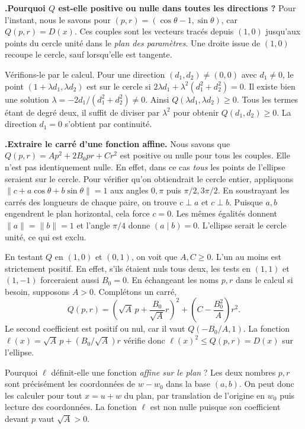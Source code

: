 \documentclass[a4paper,12pt]{article}
\newcommand{\norm}[1]{\lVert #1\rVert}
\newcommand{\ps}[2]{(#1\mid #2)}
\newcounter{pas}
\newcommand{\etape}[1]{\par\Needspace{2.25\baselineskip}\smallskip\stepcounter{pas}%
  \textbf{\textcolor{deep}{\thepas.\enspace #1}}\enspace\ignorespaces}
\begin{document}
\etape{Pourquoi $Q$ est-elle positive ou nulle dans toutes les directions ?}
Pour l'instant, nous le savons pour $(p,r)=(\cos\theta-1,\sin\theta)$, car $Q(p,r)=D(x)$. Ces couples sont les vecteurs tracés depuis $(1,0)$ jusqu'aux points du cercle unité dans le \emph{plan des paramètres}. Une droite issue de $(1,0)$ recoupe le cercle, sauf lorsqu'elle est tangente.

Vérifions-le par le calcul. Pour une direction $(d_1,d_2)\ne(0,0)$ avec $d_1\ne0$, le point $(1+\lambda d_1,\lambda d_2)$ est sur le cercle si $2\lambda d_1+\lambda^2(d_1^2+d_2^2)=0$. Il existe bien une solution $\lambda=-2d_1/(d_1^2+d_2^2)\ne0$. Ainsi $Q(\lambda d_1,\lambda d_2)\geq0$. Tous les termes étant de degré deux, il suffit de diviser par $\lambda^2$ pour obtenir $Q(d_1,d_2)\geq0$. La direction $d_1=0$ s'obtient par continuité.

\etape{Extraire le carré d’une fonction affine.}
Nous savons que $Q(p,r)=Ap^2+2B_0pr+Cr^2$ est positive ou nulle pour tous les couples. Elle n'est pas identiquement nulle. En effet, dans ce cas \emph{tous} les points de l'ellipse seraient sur le cercle. Pour vérifier qu'on obtiendrait le cercle entier, appliquons $\norm{c+a\cos\theta+b\sin\theta}=1$ aux angles $0,\pi$ puis $\pi/2,3\pi/2$. En soustrayant les carrés des longueurs de chaque paire, on trouve $c\perp a$ et $c\perp b$. Puisque $a,b$ engendrent le plan horizontal, cela force $c=0$. Les mêmes égalités donnent $\norm{a}=\norm b=1$ et l'angle $\pi/4$ donne $\ps{a}{b}=0$. L'ellipse serait le cercle unité, ce qui est exclu.

En testant $Q$ en $(1,0)$ et $(0,1)$, on voit que $A,C\geq0$. L'un au moins est strictement positif. En effet, s'ils étaient nuls tous deux, les tests en $(1,1)$ et $(1,-1)$ forceraient aussi $B_0=0$. En échangeant les noms $p,r$ dans le calcul si besoin, supposons $A>0$. Complétons un carré,
\[
 Q(p,r)=\left(\sqrt A\,p+\frac{B_0}{\sqrt A}r\right)^2
              +\left(C-\frac{B_0^2}{A}\right)r^2 .
\]
Le second coefficient est positif ou nul, car il vaut $Q(-B_0/A,1)$. La fonction $\ell(x)=\sqrt A\,p+(B_0/\sqrt A)r$ vérifie donc $\ell(x)^2\leq Q(p,r)=D(x)$ sur l'ellipse.

Pourquoi $\ell$ définit-elle une fonction \emph{affine sur le plan} ? Les deux nombres $p,r$ sont précisément les coordonnées de $w-w_0$ dans la base $(a,b)$. On peut donc les calculer pour tout $x=u+w$ du plan, par translation de l'origine en $w_0$ puis lecture des coordonnées. La fonction $\ell$ est non nulle puisque son coefficient devant $p$ vaut $\sqrt A>0$.
\end{document}
